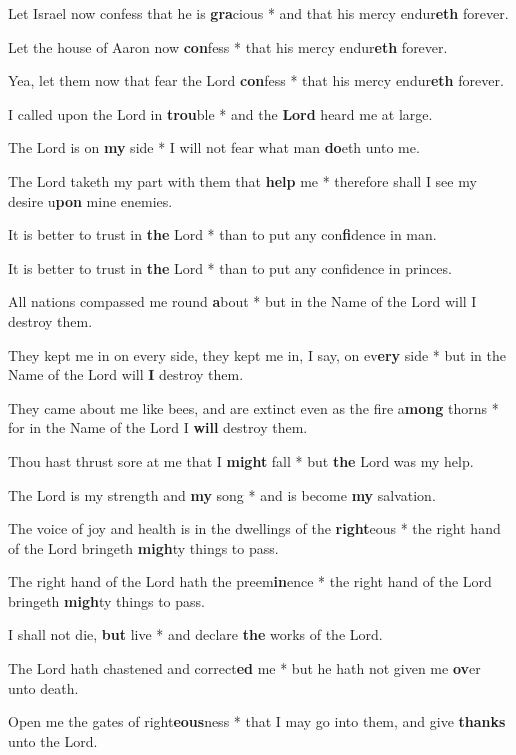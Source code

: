 \begin{multicols}{2}
	Let Israel now confess that he is \textbf{gra}cious * and that his mercy endur\textbf{eth} forever.
	
	Let the house of Aaron now \textbf{con}fess * that his mercy endur\textbf{eth} forever.
	
	Yea, let them now that fear the Lord \textbf{con}fess * that his mercy endur\textbf{eth} forever.
	
	I called upon the Lord in \textbf{trou}ble * and the \textbf{Lord} heard me at large.
	
	The Lord is on \textbf{my} side * I will not fear what man \textbf{do}eth unto me.
	
	The Lord taketh my part with them that \textbf{help} me * therefore shall I see my desire u\textbf{pon} mine enemies.
	
	It is better to trust in \textbf{the} Lord * than to put any con\textbf{fi}dence in man.
	
	It is better to trust in \textbf{the} Lord * than to put any confidence in princes.
	
	All nations compassed me round \textbf{a}bout * but in the Name of the Lord will I destroy them.
	
	They kept me in on every side, they kept me in, I say, on ev\textbf{ery} side * but in the Name of the Lord will \textbf{I} destroy them.
	
	They came about me like bees, and are extinct even as the fire a\textbf{mong} thorns * for in the Name of the Lord I \textbf{will} destroy them.
	
	Thou hast thrust sore at me that I \textbf{might} fall * but \textbf{the} Lord was my help.
	
	The Lord is my strength and \textbf{my} song * and is become \textbf{my} salvation.
	
	The voice of joy and health is in the dwellings of the \textbf{right}eous * the right hand of the Lord bringeth \textbf{migh}ty things to pass.
	
	The right hand of the Lord hath the preem\textbf{in}ence * the right hand of the Lord bringeth \textbf{migh}ty things to pass.
	
	I shall not die, \textbf{but} live * and declare \textbf{the} works of the Lord.
	
	The Lord hath chastened and correct\textbf{ed} me * but he hath not given me \textbf{ov}er unto death.
	
	Open me the gates of right\textbf{eous}ness * that I may go into them, and give \textbf{thanks} unto the Lord.
	

\end{multicols}
